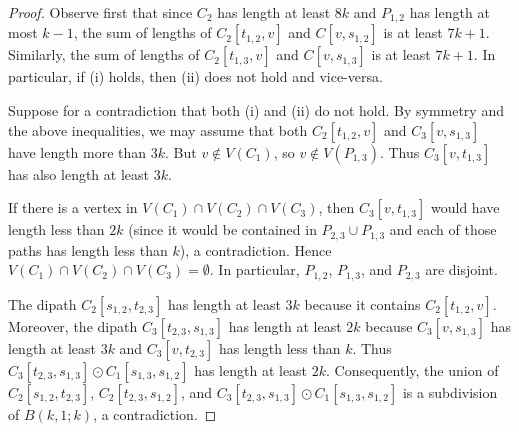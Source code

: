\documentclass{endm}
\begin{document}
\begin{proof}
Observe first that since $C_2$ has length at least $8k$ and $P_{1,2}$ has length at most $k-1$, the sum of lengths of $C_2[t_{1,2}, v]$ and  $C[v, s_{1,2}]$ is at least $7k+1$. Similarly, the sum of lengths of $C_2[t_{1,3}, v]$ and $C[v, s_{1,3}]$ is at least $7k+1$. In particular, if (i) holds, then (ii) does not hold and vice-versa.


Suppose for a contradiction that both (i) and (ii) do not hold. By symmetry and the above inequalities, we may assume that both $C_2[t_{1,2}, v]$ and $C_3[v, s_{1,3}]$ have length more than $3k$.
But $v\notin V(C_1)$, so $v\notin V(P_{1,3})$. Thus $C_3[v, t_{1,3}]$  has also length at least $3k$. 

If there is a vertex in $V(C_1)\cap V(C_2)\cap V(C_3)$, then $C_3[v,t_{1,3}]$ would have length less than $2k$ (since it would be contained in $P_{2,3}\cup P_{1,3}$ and each of those paths has length less than $k$), a contradiction.
Hence $V(C_1)\cap V(C_2)\cap V(C_3)=\emptyset$. In particular, $P_{1,2}$, $P_{1,3}$, and $P_{2,3}$ are disjoint.

The dipath  $C_2[s_{1,2}, t_{2,3}]$ has length at least $3k$ because it contains $C_2[t_{1,2},v]$. Moreover, the dipath $C_3[t_{2,3}, s_{1,3}]$ 
has length at least $2k$ because $C_3[v, s_{1,3}]$ has length at least $3k$ and $C_3[v,t_{2,3}]$ has length less than $k$.
Thus $C_3[t_{2,3}, s_{1,3}]\odot C_1[s_{1,3}, s_{1,2}]$ has length at least $2k$.
Consequently, the union of $C_2[s_{1,2}, t_{2,3}]$, $C_2[t_{2,3}, s_{1,2}]$, and $C_3[t_{2,3}, s_{1,3}]\odot C_1[s_{1,3}, s_{1,2}]$  is a subdivision of $B(k,1;k)$, a contradiction.
\end{proof}



\end{document}
